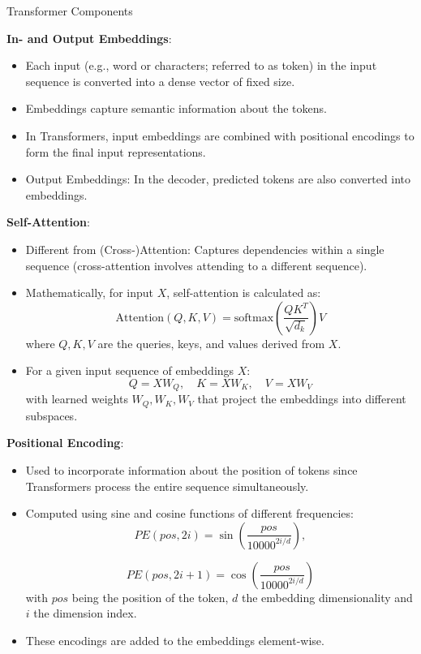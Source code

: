 \begin{vbframe}{Transformer Components}

\textbf{In- and Output Embeddings}:
  \begin{itemize}
  \item Each input (e.g., word or characters; referred to as token) in the input sequence is converted into a dense vector of fixed size.
  \item Embeddings capture semantic information about the tokens.
  \item In Transformers, input embeddings are combined with positional encodings to form the final input representations.
  \item Output Embeddings: In the decoder, predicted tokens are also converted into embeddings.
  \end{itemize}

\framebreak

\textbf{Self-Attention}:
  \begin{itemize}
    \item Different from (Cross-)Attention: Captures dependencies within a single sequence (cross-attention involves attending to a different sequence).
    \item Mathematically, for input \( X \), self-attention is calculated as:
        \[
        \text{Attention}(Q, K, V) = \text{softmax}\left(\frac{QK^T}{\sqrt{d_k}}\right) V
        \]
      where \( Q, K, V \) are the queries, keys, and values derived from \( X \).
    \item For a given input sequence of embeddings \( X \):
        \[
        Q = XW_Q, \quad K = XW_K, \quad V = XW_V
        \]
      with learned weights \( W_Q, W_K, W_V \) that project the embeddings into different subspaces.
  \end{itemize}
  
  
\framebreak
  
  \textbf{Positional Encoding}:
  \begin{itemize}
    \item Used to incorporate information about the position of tokens since Transformers process the entire sequence simultaneously.
    \item Computed using sine and cosine functions of different frequencies:
        \[
        PE(pos, 2i) = \sin\left(\frac{pos}{10000^{2i/d}}\right), 
        \]
        
        \[
        PE(pos, 2i+1) = \cos\left(\frac{pos}{10000^{2i/d}}\right)
        \]
     with \( pos \) being the position of the token, \( d \) the embedding dimensionality and \( i \) the dimension index.
     \item These encodings are added to the embeddings element-wise.
  \end{itemize}


\end{vbframe}
